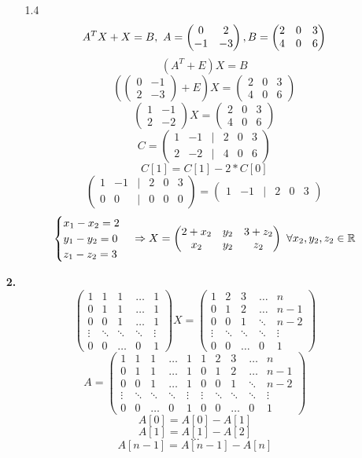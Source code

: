 \documentclass[a4paper]{article}
\newcommand{\mat}[1]{\begin{pmatrix} #1 \end{pmatrix}}
\newcommand{\case}[1]{\begin{cases} #1 \end{cases}}
\newcommand{\ts}{\text{\space}}
\renewcommand{\r}{\Rightarrow}
\newcommand{\RR}{\mathbb{R}}
\begin{document}
\begin{enumerate}
\begin{enumerate}
        \item[1.4]
        $$A^TX+X =B, \text{\space} A = \mat{0 & 2 \\ -1 & -3}, B = \mat{2 & 0 & 3 \\ 4 & 0 & 6}$$
        $$(A^T+E)X = B$$
        $$(\mat{0 & -1 \\ 2 & -3}+E)X=\mat{2 & 0 & 3 \\ 4 & 0 & 6}$$
        $$\mat{1 & -1 \\ 2 & -2}X=\mat{2 & 0 & 3 \\ 4 & 0 & 6}$$
        $$C = \mat{1 & -1 & | & 2 & 0 & 3 \\ 2 & -2 & | & 4 & 0 & 6}$$
        $$C[1] = C[1]-2*C[0]$$
        $$\mat{1 & -1 & | & 2 & 0 & 3 \\ 0 & 0 & | & 0 & 0 & 0} = \mat{1 & -1 & | & 2 & 0 & 3}$$
        $$\case{
            x_1 -x_2 = 2\\
            y_1 -y_2 = 0\\
            z_1 -z_2 = 3
        }\r X = \mat{2+x_2 & y_2 & 3+z_2 \\ x_2 & y_2 & z_2} \ts \forall x_2,y_2,z_2 \in \RR$$
        
    \end{enumerate}

    \item[\textbf{2.}]
    $$\mat{
    1 & 1 & 1 & \ldots & 1 \\
    0 & 1 & 1 & \ldots & 1 \\
    0 & 0 & 1 & \ldots & 1 \\
    \vdots & \ddots & \ddots & \ddots & \vdots \\
    0 & 0 & \ldots & 0 & 1}X 
    = \mat{
    1 & 2 & 3 & \ldots & n \\
    0 & 1 & 2 & \ldots & n-1 \\
    0 & 0 & 1 & \ddots & n-2 \\
    \vdots & \ddots & \ddots & \ddots & \vdots \\
    0 & 0 & \ldots & 0 & 1
    }$$
    $$A = \mat{
    1 & 1 & 1 & \ldots & 1  & 1 & 2 & 3 & \ldots & n\\
    0 & 1 & 1 & \ldots & 1  & 0 & 1 & 2 & \ldots & n-1\\
    0 & 0 & 1 & \ldots & 1  & 0 & 0 & 1 & \ddots & n-2\\
    \vdots & \ddots & \ddots & \ddots & \vdots  & \vdots & \ddots & \ddots & \ddots & \vdots\\
    0 & 0 & \ldots & 0 & 1 & 0 & 0 & \ldots & 0 & 1 }$$
    $$A[0] = A[0] - A[1]$$
    $$A[1] = A[1] - A[2]$$
    $$\dots$$
    $$A[n-1] = A[n-1]-A[n]$$


\end{enumerate}
\end{document}
